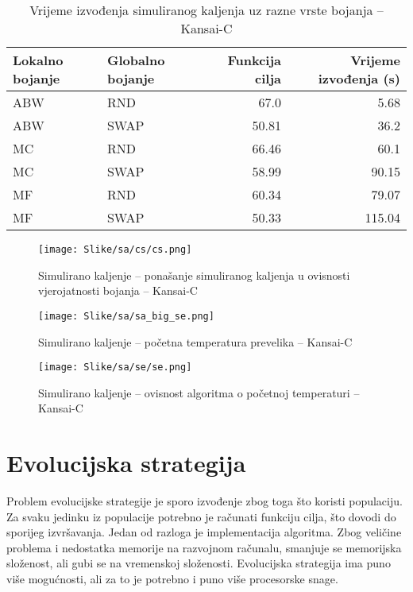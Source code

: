 \documentclass[times, utf8, diplomski, numeric]{fer}
\begin{document}
\begin{table}[htb]
	\caption{Vrijeme izvođenja simuliranog kaljenja uz razne vrste bojanja -- Kansai-C}
	\label{tbl:sa-cs4}
	\centering
	\begin{tabular}{|l||l|r|r|} \hline
	Lokalno bojanje & Globalno bojanje & Funkcija cilja & Vrijeme izvođenja (s)\\ \hline \hline
	ABW & RND & 67.0 & 5.68 \\ \hline 
	ABW & SWAP & 50.81 & 36.2 \\  \hline
	MC & RND & 66.46 & 60.1 \\ \hline
	MC & SWAP & 58.99 &  90.15 \\  \hline 
	MF & RND & 60.34 & 79.07 \\ \hline
	MF & SWAP & 50.33 & 115.04 \\ \hline
	\end{tabular}
\end{table}

\begin{figure}[htb]
	\texttt{[image: Slike/sa/cs/cs.png]}
	\caption{Simulirano kaljenje -- ponašanje simuliranog kaljenja u ovisnosti vjerojatnosti bojanja -- Kansai-C}
	\label{fig:sa_cs}
\end{figure}

\begin{figure}[htb]
	\texttt{[image: Slike/sa/sa\_big\_se.png]}
	\caption{Simulirano kaljenje -- početna temperatura prevelika -- Kansai-C}
	\label{fig:sa_big_se}
\end{figure}

\begin{figure}[htb]
	\texttt{[image: Slike/sa/se/se.png]}
	\caption{Simulirano kaljenje -- ovisnost algoritma o početnoj temperaturi -- Kansai-C}
	\label{fig:sa_se}
\end{figure}

\section{Evolucijska strategija}

Problem evolucijske strategije je sporo izvođenje zbog toga što koristi populaciju. Za svaku jedinku iz populacije potrebno je računati funkciju cilja, što dovodi do sporijeg izvršavanja. Jedan od razloga je implementacija algoritma. Zbog veličine problema i nedostatka memorije na razvojnom računalu, smanjuje se memorijska složenost, ali gubi se na vremenskoj složenosti. Evolucijska strategija ima puno više mogućnosti, ali za to je potrebno i puno više procesorske snage.
\end{document}
